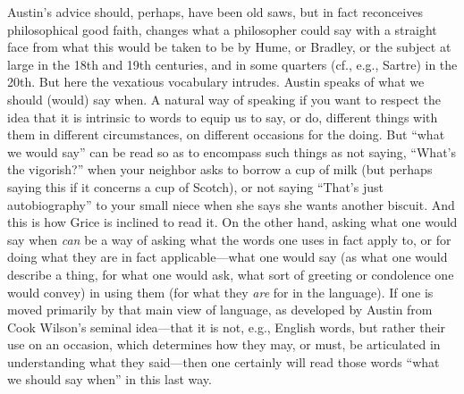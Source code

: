 Austin's advice should, perhaps, have been old saws, but in fact reconceives philosophical good faith, changes what a philosopher could say with a straight face from what this would be taken to be by Hume, or Bradley, or the subject at large in the 18th and 19th centuries, and in some quarters (cf., e.g., Sartre) in the 20th. But here the vexatious vocabulary intrudes. Austin speaks of what we should (would) say when. A natural way of speaking if you want to respect the idea that it is intrinsic to words to equip us to say, or do, different things with them in different circumstances, on different occasions for the doing. But ``what we would say'' can be read so as to encompass such things as not saying, ``What’s the vigorish?'' when your neighbor asks to borrow a cup of milk (but perhaps saying this if it concerns a cup of Scotch), or not saying ``That's just autobiography'' to your small niece when she says she wants another biscuit. And this is how Grice is inclined to read it. On the other hand, asking what one would say when \emph{can} be a way of asking what the words one uses in fact apply to, or for doing what they are in fact applicable---what one would say (as what one would describe a thing, for what one would ask, what sort of greeting or condolence one would convey) in using them (for what they \emph{are} for in the language). If one is moved primarily by that main view of language, as developed by Austin from Cook Wilson's seminal idea---that it is not, e.g., English words, but rather their use on an occasion, which determines how they may, or must, be articulated in understanding what they said—then one certainly will read those words ``what we should say when'' in this last way.


